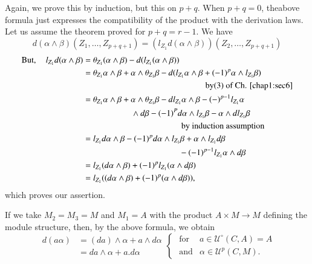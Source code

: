  Again, we prove this by induction, but this on $p+q$. When
 $p+q=0$, the\pageoriginale above formula just expresses the compatibility of the
 product with the derivation laws. Let us assume the theorem proved
 for $p+q= r-1$. We have 
 $$
 d(\alpha \wedge \beta) (Z_1, \ldots , Z_{p+q+1}) = (l_{Z_1} d (\alpha
 \wedge \beta)) (Z_2, \ldots, Z_{p+q+1}) 
 $$
\begin{align*}
  \text{But},  \quad l_{Z_1} d(\alpha \wedge \beta)  &= \theta_{Z_1} (\alpha
  \wedge \beta)  - d (l_{Z_1} (\alpha \wedge \beta ) ) \\ 
  &= \theta_{Z_1} \alpha \wedge \beta + \alpha \wedge \theta_{Z_1}
  \beta - d (l_{Z_1} \alpha \wedge \beta + (-1)^p \alpha  \wedge
  l_{Z_1} \beta )\\ 
  & \hspace{5cm}\text{ by(3) of Ch. \ref{chap1:sec6}}\\ 
  &= \theta_{Z_1} \alpha \wedge \beta + \alpha \wedge \theta_{Z_1}
  \beta - d l_{Z_1} \alpha \wedge \beta-(-)^{p-1} l_{Z_1} \alpha\\
  & \hspace{2cm}\wedge d \beta -(-1)^P d \alpha \wedge l_{Z_1} \beta -
  \alpha \wedge  d l_{Z_1} \beta \\ 
  & \hspace{4cm}\text{ by induction assumption } \\
  &= l_{Z_1} d \alpha \wedge \beta - (-1)^p d \alpha \wedge
  l_{Z_1}\beta + \alpha \wedge l_{Z_1} d \beta\\ 
  & \hspace{4cm}-(-1)^{p-1} l_{Z_1}
  \alpha \wedge d \beta \\ 
  &= l_{Z_1}(d \alpha \wedge \beta )+ (-1)^p l_{Z_1} (\alpha \wedge d \beta )\\
  &= l_{Z_1}((d \alpha \wedge \beta) + (-1)^p (\alpha \wedge d \beta )) ,
\end{align*} 
 which proves our assertion.

\begin{remark*}
  If we take $M_2= M_3=M$ and $M_1 =A$ with the product $A \times M
  \to M$ defining the module structure, then, by the above formula, we
  obtain 
  \begin{equation*}
    \begin{aligned}
    d (a \alpha ) &= (da) \wedge \alpha + a \wedge d \alpha \\
    & = da \wedge \alpha + a. d \alpha 
    \end{aligned}
    \begin{cases}
      \text{ for} & a \in \mathscr{U}^\circ ( C, A ) = A\\
      \text{ and} & \alpha \in \mathscr{U}^p ( C, M ).
    \end{cases}
  \end{equation*}
\end{remark*} 

